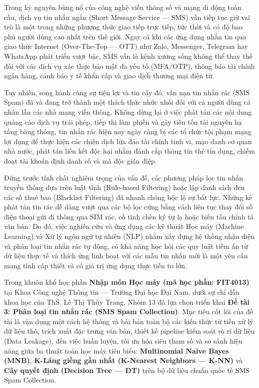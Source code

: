 
Trong kỷ nguyên bùng nổ của công nghệ viễn thông số và mạng di động toàn cầu, dịch vụ tin nhắn ngắn (Short Message Service --- SMS) vẫn tiếp tục giữ vai trò là một trong những phương thức giao tiếp trực tiếp, tức thời và có độ bao phủ người dùng cao nhất trên thế giới. Ngay cả khi các ứng dụng nhắn tin qua giao thức Internet (Over-The-Top --- OTT) như Zalo, Messenger, Telegram hay WhatsApp phát triển vượt bậc, SMS vẫn là kênh xương sống không thể thay thế đối với các dịch vụ xác thực bảo mật đa yếu tố (MFA/OTP), thông báo tài chính ngân hàng, cảnh báo y tế khẩn cấp và giao dịch thương mại điện tử.

Tuy nhiên, song hành cùng sự tiện lợi và tin cậy đó, vấn nạn tin nhắn rác (SMS Spam) đã và đang trở thành một thách thức nhức nhối đối với cả người dùng cá nhân lẫn các nhà mạng viễn thông. Không dừng lại ở việc phát tán các nội dung quảng cáo dịch vụ trái phép, tiếp thị làm phiền và gây tiêu tốn tài nguyên hạ tầng băng thông, tin nhắn rác hiện nay ngày càng bị các tổ chức tội phạm mạng lợi dụng để thực hiện các chiến dịch lừa đảo tài chính tinh vi, mạo danh cơ quan nhà nước, phát tán liên kết độc hại nhằm đánh cắp thông tin thẻ tín dụng, chiếm đoạt tài khoản định danh số và mã độc gián điệp.

Đứng trước tính chất nghiêm trọng của vấn đề, các phương pháp lọc tin nhắn truyền thống dựa trên luật tĩnh (Rule-based Filtering) hoặc lập danh sách đen các số thuê bao (Blacklist Filtering) đã nhanh chóng bộc lộ sự bất lực. Những kẻ phát tán tin rác dễ dàng vượt qua các bộ lọc cứng bằng cách liên tục thay đổi số điện thoại gửi đi thông qua SIM rác, cố tình chèn ký tự lạ hoặc biến tấu chính tả văn bản. Do đó, việc nghiên cứu và ứng dụng các kỹ thuật Học máy (Machine Learning) và Xử lý ngôn ngữ tự nhiên (NLP) nhằm xây dựng hệ thống nhận diện và phân loại tin nhắn rác tự động, có khả năng học hỏi các quy luật tiềm ẩn từ dữ liệu thực tế và thích ứng linh hoạt với các mẫu tin nhắn mới là một yêu cầu mang tính cấp thiết và có giá trị ứng dụng thực tiễn to lớn.

Trong khuôn khổ học phần \textbf{Nhập môn Học máy (mã học phần: FIT4013)} tại Khoa Công nghệ Thông tin --- Trường Đại học Đại Nam, dưới sự chỉ dẫn khoa học của ThS. Lê Thị Thùy Trang, Nhóm 13 đã lựa chọn triển khai \textbf{Đề tài 3: Phân loại tin nhắn rác (SMS Spam Collection)}. Mục tiêu cốt lõi của đề tài là vận dụng một cách hệ thống và bài bản toàn bộ các kiến thức từ tiền xử lý dữ liệu thô, trích xuất đặc trưng văn bản, thiết kế pipeline kiểm soát rò rỉ dữ liệu (Data Leakage), đến việc huấn luyện, tối ưu hóa siêu tham số và so sánh hiệu năng giữa ba thuật toán học máy tiêu biểu: \textbf{Multinomial Naive Bayes (MNB)}, \textbf{K-Láng giềng gần nhất (K-Nearest Neighbors --- K-NN)} và \textbf{Cây quyết định (Decision Tree --- DT)} trên bộ dữ liệu chuẩn quốc tế SMS Spam Collection.

